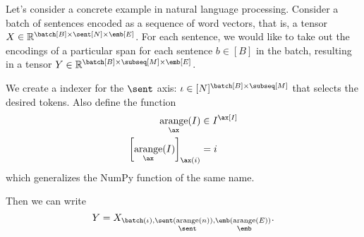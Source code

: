 Let's consider a concrete example in natural language processing. Consider a batch of sentences encoded as a sequence of word vectors, that is, a tensor $X \in \mathbb{R}^{\batch[B] \times \sent[N] \times \emb[E]}$. For each sentence, we would like to take out the encodings of a particular span for each sentence $b \in [B]$ in the batch, resulting in a tensor $Y \in \mathbb{R}^{\batch[B] \times \subseq[M] \times \emb[E]}$.

We create a indexer for the $\sent$ axis: $\iota \in [N]^{\batch[B] \times \subseq[M]}$ that selects the desired tokens. Also define the function
\begin{align*}
  \nfun{\ax}{arange}(I) &\in I^{\ax[I]} \\
  \left[\nfun{\ax}{arange}(I)\right]_{\ax(i)} &= i
\end{align*}
which generalizes the NumPy function of the same name.

Then we can write
\begin{equation*}
  Y = X_{\batch(\iota), \sent(\nfun{\sent}{arange}(n)), \emb(\nfun{\emb}{arange}(E))}.
\end{equation*}
